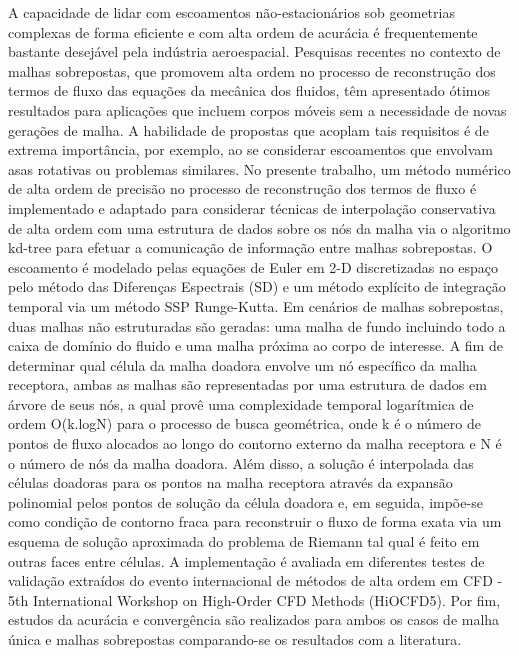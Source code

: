 A capacidade de lidar com escoamentos n{\~a}o-estacion{\'a}rios sob geometrias complexas de forma eficiente e com alta ordem de acur{\'a}cia {\'e} frequentemente bastante desej{\'a}vel pela ind{\'u}stria aeroespacial. Pesquisas recentes no contexto de malhas sobrepostas, que promovem alta ordem no processo de reconstru\c{c}{\~a}o dos termos de fluxo das equa\c{c}{\~o}es da mec{\^a}nica dos fluidos, t{\^e}m apresentado {\'o}timos resultados para aplica\c{c}{\~o}es que incluem corpos m{\'o}veis sem a necessidade de novas gera\c{c}{\~o}es de malha. A habilidade de propostas que acoplam tais requisitos {\'e} de extrema import{\^a}ncia, por exemplo, ao se considerar escoamentos que envolvam asas rotativas ou problemas similares. No presente trabalho, um m{\'e}todo num{\'e}rico de alta ordem de precis{\~a}o no processo de reconstru\c{c}{\~a}o dos termos de fluxo {\'e} implementado e adaptado para considerar t{\'e}cnicas de interpola\c{c}{\~a}o conservativa de alta ordem com uma estrutura de dados sobre os n{\'o}s da malha via o algoritmo kd-tree para efetuar a comunica\c{c}{\~a}o de informa\c{c}{\~a}o entre malhas sobrepostas. O escoamento {\'e} modelado pelas equa\c{c}{\~o}es de Euler em 2-D discretizadas no espa\c{c}o pelo m{\'e}todo das Diferen\c{c}as Espectrais (SD) e um m{\'e}todo expl{\'i}cito de integra\c{c}{\~a}o temporal via um m{\'e}todo SSP Runge-Kutta. Em cen{\'a}rios de malhas sobrepostas, duas malhas n{\~a}o estruturadas s{\~a}o geradas: uma malha de fundo incluindo todo a caixa de dom{\'i}nio do fluido e uma malha pr{\'o}xima ao corpo de interesse. A fim de determinar qual c{\'e}lula da malha doadora envolve um n{\'o} espec{\'i}fico da malha receptora, ambas as malhas s{\~a}o representadas por uma estrutura de dados em {\'a}rvore de seus n{\'o}s, a qual prov{\^e} uma complexidade temporal logar{\'i}tmica de ordem O(k.logN) para o processo de busca geom{\'e}trica, onde k {\'e} o n{\'u}mero de pontos de fluxo alocados ao longo do contorno externo da malha receptora e N {\'e} o n{\'u}mero de n{\'o}s da malha doadora. Al{\'e}m disso, a solu\c{c}{\~a}o {\'e} interpolada das c{\'e}lulas doadoras para os pontos na malha receptora atrav{\'e}s da expans{\~a}o polinomial pelos pontos de solu\c{c}{\~a}o da c{\'e}lula doadora e, em seguida, imp{\~o}e-se como condi\c{c}{\~a}o de contorno  fraca para reconstruir o fluxo de forma exata via um esquema de solu\c{c}{\~a}o aproximada do problema de Riemann tal qual {\'e} feito em outras faces entre c{\'e}lulas. A implementa\c{c}{\~a}o {\'e} avaliada em diferentes testes de valida\c{c}{\~a}o extra{\'i}dos do evento internacional de m{\'e}todos de alta ordem em CFD - 5th International Workshop on High-Order CFD Methods (HiOCFD5). Por fim, estudos da acur{\'a}cia e converg{\^e}ncia s{\~a}o realizados para ambos os casos de malha {\'u}nica e malhas sobrepostas comparando-se os resultados com a literatura.